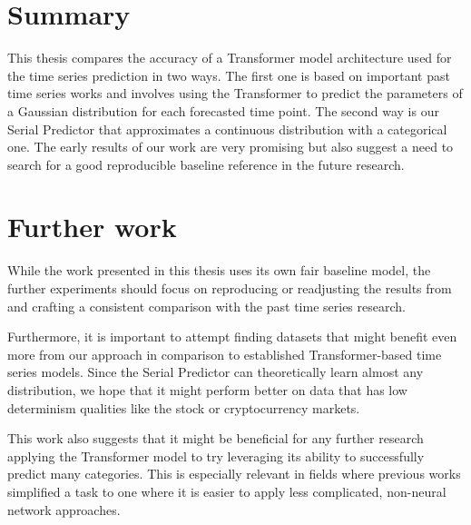 \documentclass[en]{pracamgr}
\begin{document}
\section{Summary}

This thesis compares the accuracy of a Transformer model architecture used for the time series prediction in two ways. The first one is based on important past time series works and involves using the Transformer to predict the parameters of a Gaussian distribution for each forecasted time point. The second way is our Serial Predictor that approximates a continuous distribution with a categorical one. The early results of our work are very promising but also suggest a need to search for a good reproducible baseline reference in the future research.

\section{Further work}

While the work presented in this thesis uses its own fair baseline model, the further experiments should focus on reproducing or readjusting the results from \cite{enhancing} and crafting a consistent comparison with the past time series research.

Furthermore, it is important to attempt finding datasets that might benefit even more from our approach in comparison to established Transformer-based time series models. Since the Serial Predictor can theoretically learn almost any distribution, we hope that it might perform better on data that has low determinism qualities like the stock or cryptocurrency markets.

This work also suggests that it might be beneficial for any further research applying the Transformer model to try leveraging its ability to successfully predict many categories.
This is especially relevant in fields where previous works simplified a task to one where it is easier to apply less complicated, non-neural network approaches.
\end{document}
